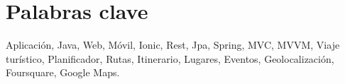 \newpage
\chapter*{Palabras clave}


Aplicación, Java, Web, Móvil, Ionic, Rest, Jpa, Spring, MVC, MVVM, Viaje turístico, Planificador, Rutas, Itinerario, Lugares, Eventos, Geolocalización, Foursquare, Google Maps.